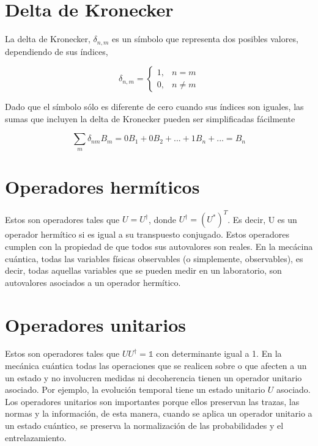 \section{Delta de Kronecker}

La delta de Kronecker, $\delta_{n,m}$ es un símbolo que representa dos posibles valores, dependiendo de sus índices,

\begin{equation}
    \delta_{n,m} =
    \begin{cases}
        1, & n = m \\
        0, & n \neq m
    \end{cases}
\end{equation}

Dado que el símbolo sólo es diferente de cero cuando sus índices son iguales, las sumas que incluyen la delta de Kronecker pueden ser simplificadas fácilmente

\begin{equation*}
    \sum\limits_m \delta_{nm} B_m = 0 B_1 + 0 B_2 + ... + 1 B_n + ... = B_n
\end{equation*}

\section{Operadores hermíticos}

Estos son operadores tales que $U = U^\dagger$, donde $U^\dagger = (U^*)^T$. Es decir, U es un operador hermítico si es igual a su transpuesto conjugado. Estos operadores cumplen con la propiedad de que todos sus autovalores son reales. En la mecácina cuántica, todas las variables físicas observables (o simplemente, observables), es decir, todas aquellas variables que se pueden medir en un laboratorio, son autovalores asociados a un operador hermítico.

\section{Operadores unitarios}

Estos son operadores tales que $U U^\dagger = \mathds{1}$ con determinante igual a 1. En la mecánica cuántica todas las operaciones que se realicen sobre o que afecten a un un estado y no involucren medidas ni decoherencia tienen un operador unitario asociado. Por ejemplo, la evolución temporal tiene un estado unitario $U$ asociado. Los operadores unitarios son importantes porque ellos preservan las trazas, las normas y la información, de esta manera, cuando se aplica un operador unitario a un estado cuántico, se preserva la normalización de las probabilidades y el entrelazamiento.

